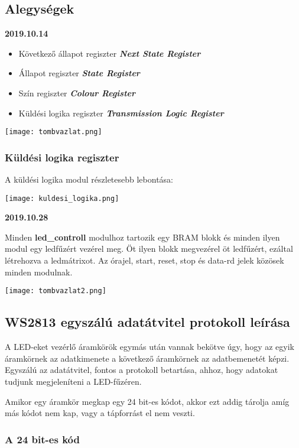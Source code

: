 \documentclass[10pt]{article} %
\begin{document}
\subsection{Alegységek}

\textbf{2019.10.14}
\begin{itemize}
\item Következő állapot regiszter \textbf{\textit{Next State Register}}
\item Állapot regiszter \textbf{\textit{State Register}}
\item Szín regiszter \textbf{\textit{Colour Register}}
\item Küldési logika regiszter \textbf{\textit{Transmission Logic Register}}
\end{itemize}

\texttt{[image: tombvazlat.png]}

\subsubsection{Küldési logika regiszter}

\noindent A küldési logika modul részletesebb lebontása: 

\texttt{[image: kuldesi\_logika.png]}

\textbf{2019.10.28}

\indent Minden \textbf{led\_controll} modulhoz tartozik egy BRAM blokk és minden ilyen modul egy ledfűzért vezérel meg. Öt ilyen blokk megvezérel öt ledfűzért, ezáltal létrehozva a ledmátrixot.
Az órajel, start, reset, stop és data-rd jelek közösek minden modulnak.

\texttt{[image: tombvazlat2.png]}


\subsection{WS2813 egyszálú adatátvitel protokoll leírása}

\indent A LED-eket vezérlő áramkörök egymás után vannak bekötve úgy, hogy az egyik áramkörnek az adatkimenete a következő áramkörnek az adatbemenetét képzi. Egyszálú az adatátvitel, fontos a protokoll betartása, ahhoz, hogy adatokat tudjunk megjeleníteni a LED-fűzéren.

Amikor egy áramkör megkap egy 24 bit-es kódot, akkor ezt addig tárolja amíg más kódot nem kap, vagy a tápforrást el nem veszti.

\subsubsection{A 24 bit-es kód}
\end{document}
